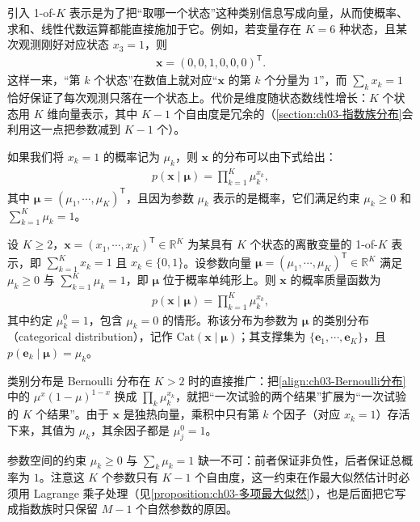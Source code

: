 \documentclass[../../main.tex]{subfiles}
\begin{document}
\begin{remark}
引入 1-of-$K$ 表示是为了把“取哪一个状态”这种类别信息写成向量，从而使概率、求和、线性代数运算都能直接施加于它。例如，若变量存在 $K=6$ 种状态，且某次观测刚好对应状态 $x_3=1$，则
\begin{align}
\boldsymbol{x}=(0,0,1,0,0,0)^{\mathsf{T}}.
\label{align:ch03-独热编码}
\end{align}
这样一来，“第 $k$ 个状态”在数值上就对应“$\boldsymbol{x}$ 的第 $k$ 个分量为 $1$”，而 $\sum_{k}x_k=1$ 恰好保证了每次观测只落在一个状态上。代价是维度随状态数线性增长：$K$ 个状态用 $K$ 维向量表示，其中 $K-1$ 个自由度是冗余的（\cref{section:ch03-指数族分布}会利用这一点把参数减到 $K-1$ 个）。
\end{remark}

如果我们将 $x_k=1$ 的概率记为 $\mu_k$，则 $\boldsymbol{x}$ 的分布可以由下式给出：
\begin{align}
p(\boldsymbol{x}\mid\boldsymbol{\mu})=\prod_{k=1}^{K}\mu_k^{x_k},
\label{align:ch03-类别分布}
\end{align}
其中 $\boldsymbol{\mu}=(\mu_1,\cdots,\mu_K)^{\mathsf{T}}$，且因为参数 $\mu_k$ 表示的是概率，它们满足约束 $\mu_k\geqslant0$ 和 $\sum_{k=1}^{K}\mu_k=1$。

\begin{definition}[类别分布]\label{definition:ch03-类别分布}
设 $K\geqslant2$，$\boldsymbol{x}=(x_1,\cdots,x_K)^{\mathsf{T}}\in\mathbb{R}^{K}$ 为某具有 $K$ 个状态的离散变量的 1-of-$K$ 表示，即 $\sum_{k=1}^{K}x_k=1$ 且 $x_k\in\{0,1\}$。设参数向量 $\boldsymbol{\mu}=(\mu_1,\cdots,\mu_K)^{\mathsf{T}}\in\mathbb{R}^{K}$ 满足 $\mu_k\geqslant0$ 与 $\sum_{k=1}^{K}\mu_k=1$，即 $\boldsymbol{\mu}$ 位于概率单纯形上。则 $\boldsymbol{x}$ 的概率质量函数为
\begin{align*}
p(\boldsymbol{x}\mid\boldsymbol{\mu})=\prod_{k=1}^{K}\mu_k^{x_k},
\end{align*}
其中约定 $\mu_k^{0}=1$，包含 $\mu_k=0$ 的情形。称该分布为参数为 $\boldsymbol{\mu}$ 的类别分布（categorical distribution），记作 $\mathrm{Cat}(\boldsymbol{x}\mid\boldsymbol{\mu})$；其支撑集为 $\{\boldsymbol{e}_1,\cdots,\boldsymbol{e}_K\}$，且 $p(\boldsymbol{e}_k\mid\boldsymbol{\mu})=\mu_k$。
\end{definition}

\begin{remark}
类别分布是 Bernoulli 分布在 $K>2$ 时的直接推广：把\eqref{align:ch03-Bernoulli分布}中的 $\mu^{x}(1-\mu)^{1-x}$ 换成 $\prod_k\mu_k^{x_k}$，就把“一次试验的两个结果”扩展为“一次试验的 $K$ 个结果”。由于 $\boldsymbol{x}$ 是独热向量，乘积中只有第 $k$ 个因子（对应 $x_k=1$）存活下来，其值为 $\mu_k$，其余因子都是 $\mu_j^{0}=1$。

参数空间的约束 $\mu_k\geqslant0$ 与 $\sum_k\mu_k=1$ 缺一不可：前者保证非负性，后者保证总概率为 $1$。注意这 $K$ 个参数只有 $K-1$ 个自由度，这一约束在作最大似然估计时必须用 Lagrange 乘子处理（见\cref{proposition:ch03-多项最大似然}），也是后面把它写成指数族时只保留 $M-1$ 个自然参数的原因。
\end{remark}
\end{document}
